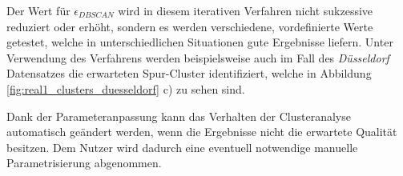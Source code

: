 Der Wert für $\epsilon_{DBSCAN}$ wird in diesem iterativen Verfahren nicht sukzessive reduziert oder erhöht,
sondern es werden verschiedene, vordefinierte Werte getestet, welche in unterschiedlichen Situationen
gute Ergebnisse liefern.
Unter Verwendung des Verfahrens werden beispielsweise auch im Fall des \textit{Düsseldorf} Datensatzes die erwarteten
Spur-Cluster identifiziert, welche in Abbildung \ref{fig:real1_clusters_duesseldorf} c) zu sehen sind.

Dank der Parameteranpassung kann das Verhalten der Clusteranalyse automatisch geändert werden,
wenn die Ergebnisse nicht die erwartete Qualität besitzen. Dem Nutzer wird dadurch eine eventuell notwendige
manuelle Parametrisierung abgenommen.